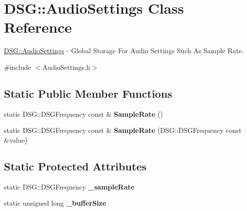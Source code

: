 \hypertarget{class_d_s_g_1_1_audio_settings}{\section{D\+S\+G\+:\+:Audio\+Settings Class Reference}
\label{class_d_s_g_1_1_audio_settings}
}


\hyperlink{class_d_s_g_1_1_audio_settings}{D\+S\+G\+::\+Audio\+Settings} -\/ Global Storage For Audio Settings Such As Sample Rate.  




{\ttfamily \#include $<$Audio\+Settings.\+h$>$}

\subsection*{Static Public Member Functions}
\begin{DoxyCompactItemize}
\item 
\hypertarget{class_d_s_g_1_1_audio_settings_a4f459c389b10c11828e2f2f00c012c49}{static D\+S\+G\+::\+D\+S\+G\+Frequency const \& {\bfseries Sample\+Rate} ()}\label{class_d_s_g_1_1_audio_settings_a4f459c389b10c11828e2f2f00c012c49}

\item 
\hypertarget{class_d_s_g_1_1_audio_settings_a9c5640e47b6eaa4331a0e5053abb1314}{static D\+S\+G\+::\+D\+S\+G\+Frequency const \& {\bfseries Sample\+Rate} (D\+S\+G\+::\+D\+S\+G\+Frequency const \&value)}\label{class_d_s_g_1_1_audio_settings_a9c5640e47b6eaa4331a0e5053abb1314}

\end{DoxyCompactItemize}
\subsection*{Static Protected Attributes}
\begin{DoxyCompactItemize}
\item 
\hypertarget{class_d_s_g_1_1_audio_settings_a56869b51933f102b197f54001c8a1d27}{static D\+S\+G\+::\+D\+S\+G\+Frequency {\bfseries \+\_\+sample\+Rate}}\label{class_d_s_g_1_1_audio_settings_a56869b51933f102b197f54001c8a1d27}

\item 
\hypertarget{class_d_s_g_1_1_audio_settings_a21c13b7013f2593c67414070700241ee}{static unsigned long {\bfseries \+\_\+buffer\+Size}}\label{class_d_s_g_1_1_audio_settings_a21c13b7013f2593c67414070700241ee}

\end{DoxyCompactItemize}


